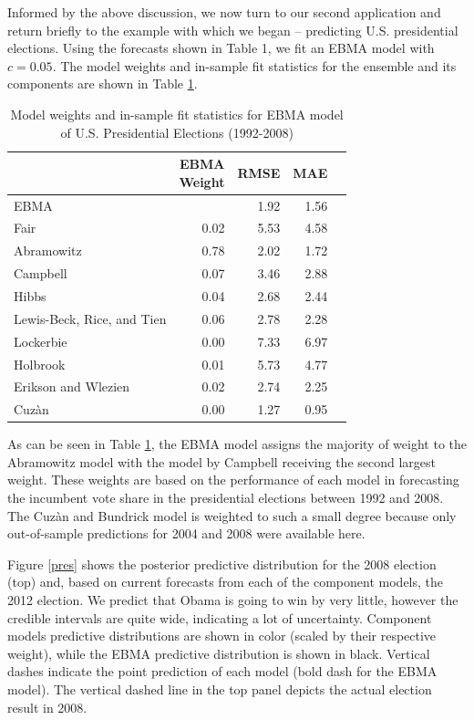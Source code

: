 \documentclass[12pt,fullpage,endnotes]{article}
\begin{document}
Informed by the above discussion, we now turn to our second
application and return briefly to the example with which we began --
predicting U.S. presidential elections.  Using the forecasts shown in
Table 1, we fit an EBMA model with $c=0.05$.  The model weights and
in-sample fit statistics for the ensemble and its components are shown
in Table \ref{presModel}.


\begin{table}[ht]
\caption{Model weights and in-sample fit statistics for EBMA model of U.S. Presidential Elections (1992-2008)}
\label{presModel}
\begin{center}
\begin{tabular}{lrrrr}
  \toprule
 & \shortstack{EBMA\\ Weight}&RMSE &MAE \\ 
  \midrule
EBMA &  & 1.92 & 1.56 \\ 
  Fair & 0.02 & 5.53 & 4.58 \\ 
  Abramowitz & 0.78 & 2.02 & 1.72 \\ 
  Campbell  & 0.07 & 3.46 & 2.88 \\ 
  Hibbs  & 0.04 & 2.68 & 2.44 \\ 
  Lewis-Beck, Rice, and Tien & 0.06 & 2.78 & 2.28 \\ 
  Lockerbie  & 0.00 & 7.33 & 6.97 \\ 
 Holbrook & 0.01 & 5.73 & 4.77 \\ 
  Erikson and Wlezien & 0.02 & 2.74 & 2.25 \\ 
  Cuz\`an & 0.00 & 1.27 & 0.95 \\ 
   \bottomrule
\end{tabular}
\end{center}
\end{table}

As can be seen in Table \ref{presModel}, the EBMA model assigns the
majority of weight to the Abramowitz model with the model by Campbell
receiving the second largest weight. These weights are based on the
performance of each model in forecasting the incumbent vote share in
the presidential elections between 1992 and 2008. The Cuz\`an and
Bundrick model is weighted to such a small degree because only
out-of-sample predictions for 2004 and 2008 were available here.




Figure \ref{pres} shows the posterior predictive distribution for the
2008 election (top) and, based on current forecasts from each of the
component models, the 2012 election.  We predict that Obama is going to
win by very little, however the credible intervals are quite wide,
indicating a lot of uncertainty. Component models predictive
distributions are shown in color (scaled by their respective weight),
while the EBMA predictive distribution is shown in black. Vertical
dashes indicate the point prediction of each model (bold dash for the
EBMA model). The vertical dashed line in the top panel depicts the
actual election result in 2008.
\end{document}
